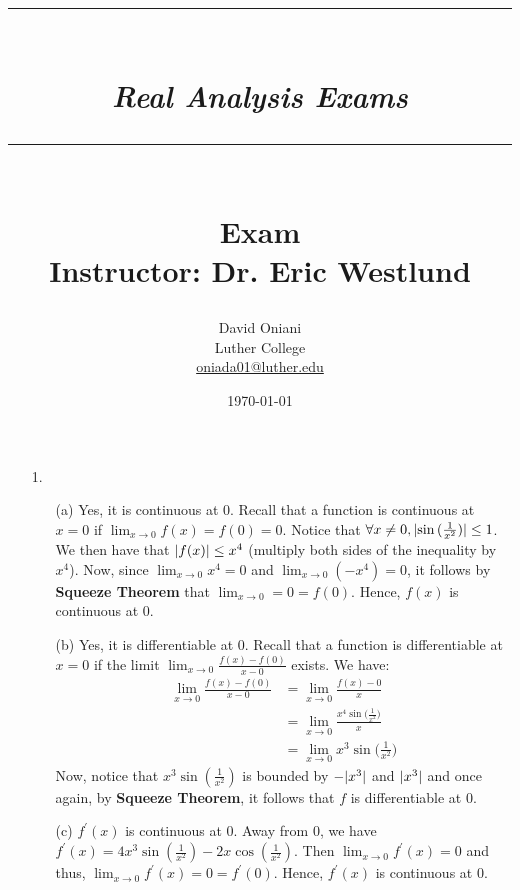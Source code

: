 \documentclass[11pt]{article}
\author{David Oniani\\
        Luther College\\
        \href{mailto:oniada01@luther.edu}{oniada01@luther.edu}}
\title{\rule{\paperwidth - 150pt}{1pt}\textbf{\\\textit{Real Analysis
Exams}\\}\rule {\paperwidth - 150pt}{1pt}\\\textbf{Exam
\textnumero3}\\{\normalsize Instructor: Dr. Eric Westlund}}
\date{\today}
\DeclarePairedDelimiter\abs{\lvert}{\rvert}%
\begin{document}
\maketitle


\begin{itemize}
    \item[1.]
        \begin{itemize}
            \item[(a)]
                Yes, it is continuous at $0$. Recall that a function is
                continuous at $x = 0$ if $\lim_{x \to 0}f(x) = f(0) = 0$.
                Notice that $\forall x \neq 0, \abs{\sin{(\frac{1}{x^2})}} \leq
                1$. We then have that $\abs{f(x)} \leq x^4$ (multiply both
                sides of the inequality by $x^4$). Now, since $\lim_{x \to 0}
                x^4 = 0$ and $\lim_{x \to 0} (-x^4) = 0$, it follows by
                \textbf{Squeeze Theorem} that $\lim_{x \to 0} = 0 = f(0)$.
                Hence, $f(x)$ is continuous at $0$.

            \item[(b)]
                Yes, it is differentiable at $0$. Recall that a function is
                differentiable at $x = 0$ if the limit $\lim_{x \to 0}
                \frac{f(x) - f(0)}{x - 0}$ exists. We have:
                \begin{align*}
                    \lim_{x \to 0} \frac{f(x) - f(0)}{x - 0}
                        &= \lim_{x \to 0} \frac{f(x) - 0}{x}\\
                        &= \lim_{x \to 0} \frac{x^4\sin{(\frac{1}{x^2}})}{x}\\
                        &= \lim_{x \to 0} x^3\sin{\Big(\frac{1}{x^2}}\Big)
                \end{align*}
                Now, notice that $x^3\sin{(\frac{1}{x^2})}$ is bounded by
                $-\abs{x^3}$ and $\abs{x^3}$ and once again, by \textbf{Squeeze
                Theorem}, it follows that $f$ is differentiable at $0$.

            \item[(c)]
                $f^\prime(x)$ is continuous at $0$. Away from $0$, we have
                $f^\prime(x) = 4x^3 \sin{(\frac{1}{x^2})} -
                2x\cos{(\frac{1}{x^2})}$. Then $\lim_{x \to 0} f^\prime(x) = 0$
                and thus, $\lim_{x \to 0} f^\prime(x) = 0 = f^\prime(0)$.
                Hence, $f^\prime(x)$ is continuous at $0$.


\end{itemize}
\end{itemize}
\end{document}
